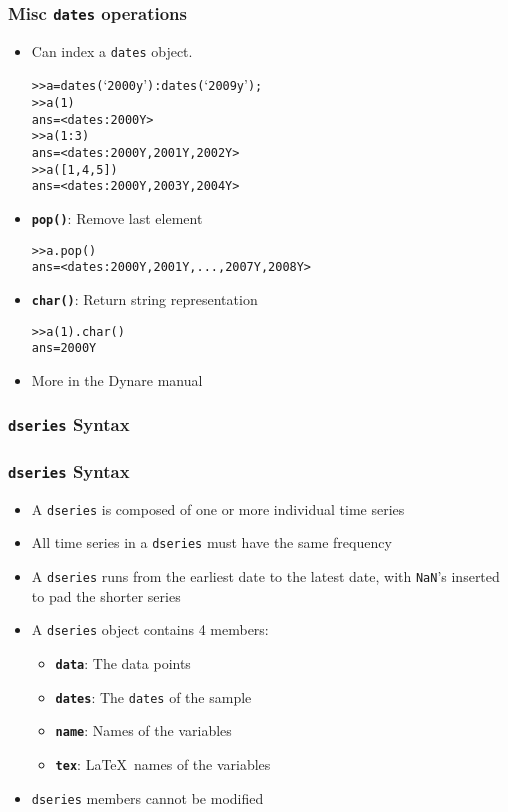 \documentclass[10pt]{beamer}
\newcommand{\myitem}{\item[$\bullet$]}
\begin{document}
\begin{frame}[fragile,t]
  \frametitle{Misc \texttt{dates} operations}
  \begin{itemize}
    \myitem Can index a \texttt{dates} object.
    \begin{alltt}
  >> a = dates(`2000y'):dates(`2009y');
  >> a(1)
  ans = <dates: 2000Y>
  >> a(1:3)
  ans = <dates: 2000Y, 2001Y, 2002Y>
  >> a([1,4,5])
  ans = <dates: 2000Y, 2003Y, 2004Y>
    \end{alltt}
    \myitem{\textbf{\texttt{pop()}}}: Remove last element
    \begin{alltt}
  >> a.pop()
  ans = <dates: 2000Y, 2001Y,  ..., 2007Y, 2008Y>
    \end{alltt}
    \myitem{\textbf{\texttt{char()}}}: Return string representation
    \begin{alltt}
  >> a(1).char()
  ans = 2000Y
    \end{alltt}
    \myitem More in the Dynare manual
  \end{itemize}
\end{frame}


%
%
\subsubsection{\texttt{dseries} Syntax}
\begin{frame}[fragile,t]
  \frametitle{\texttt{dseries} Syntax}
  \begin{itemize}
    \myitem A \texttt{dseries} is composed of one or more individual time series
    \myitem All time series in a \texttt{dseries} must have the same frequency
    \myitem A \texttt{dseries} runs from the earliest date to the latest date,
    with \texttt{NaN}'s inserted to pad the shorter series
    \myitem A \texttt{dseries} object contains 4 members:
    \begin{itemize}
      \myitem{\textbf{\texttt{data}}}: The data points
      \myitem{\textbf{\texttt{dates}}}: The \texttt{dates} of the sample
      \myitem{\textbf{\texttt{name}}}: Names of the variables
      \myitem{\textbf{\texttt{tex}}}: \LaTeX\ names of the variables
    \end{itemize}
    \myitem \texttt{dseries} members cannot be modified
  \end{itemize}
\end{frame}
\end{document}
